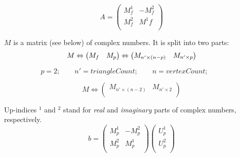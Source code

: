\documentclass[12pt]{article}
\begin{document}
			\begin{displaymath}
				A = \begin{pmatrix}
					M^{1}_{f} & -M^{2}_{f} \\
					M^{2}_{f} & M^{1}{f} \\
				\end{pmatrix}
			\end{displaymath}
				
			$M$ is a matrix (see below) of complex numbers. It is split into two parts:
			\\
			
			\begin{displaymath}
				M \Leftrightarrow 
				\begin{pmatrix}
					M_{f} & M_{p} \cr
				\end{pmatrix}
				\Leftrightarrow 
				\begin{pmatrix}
					 M_{n' \times (n - p)} & M_{n' \times p} \\
				\end{pmatrix}
			\end{displaymath}
			
			\begin{displaymath}
				p = 2 ;\qquad 
				n' = triangleCount ;\qquad 
				n = vertexCount ;\qquad 
			\end{displaymath}
			
			\begin{displaymath}
				M \Leftrightarrow 
				\begin{pmatrix}
					M_{n' \times (n - 2)} & M_{n' \times 2} \\
				\end{pmatrix}
			\end{displaymath}
	
			Up-indices $^{1}$ and $^{2}$ stand for \emph{real} and \emph{imaginary} parts of complex numbers, respectively.		
			\\
			
			\begin{displaymath}
				b = 
				\begin{pmatrix}
					M^{1}_{p} & -M^{2}_{p} \\ 
					M^{2}_{p} & M^{1}_{p} \\
				\end{pmatrix}
				\begin{pmatrix}
					U^{1}_{p} \\
					U^{2}_{p} \\ 
				\end{pmatrix}
			\end{displaymath}
			
\end{document}
